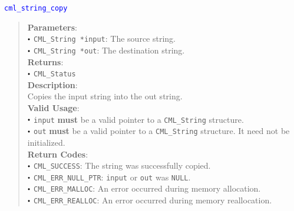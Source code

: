 \documentclass[a4paper,oneside,10pt]{article}
\newcommand{\function}[1]{
  \noindent\textcolor{blue}{\texttt{#1}}
  \vspace{-0.3em}
}
\renewcommand{\dot}{\raisebox{0.3ex}{\scalebox{0.6}{$\bullet$}}}
\theoremstyle{definition}
\begin{document}
\function{cml\_string\_copy}
\begin{quote}
  \textbf{Parameters}: \\
  $\dot$ \texttt{CML\_String *input}: The source string. \\
  $\dot$ \texttt{CML\_String *out}: The destination string. \\
  \textbf{Returns}: \\
  $\dot$ \texttt{CML\_Status} \\
  
  \vspace{-0.75em}
  \textbf{Description}: \\
  Copies the input string into the out string. \\

  \vspace{-0.75em}
  \textbf{Valid Usage}: \\
  $\dot$ \texttt{input} \textbf{must} be a valid pointer to a \texttt{CML\_String} structure. \\
  $\dot$ \texttt{out} \textbf{must} be a valid pointer to a \texttt{CML\_String} structure. It need not be initialized. \\

  \vspace{-0.75em}
  \textbf{Return Codes}: \\
  $\dot$ \texttt{CML\_SUCCESS}: The string was successfully copied. \\
  $\dot$ \texttt{CML\_ERR\_NULL\_PTR}: \texttt{input} or \texttt{out} was \texttt{NULL}. \\
  $\dot$ \texttt{CML\_ERR\_MALLOC}: An error occurred during memory allocation. \\
  $\dot$ \texttt{CML\_ERR\_REALLOC}: An error occurred during memory reallocation. \\
\end{quote}
\end{document}
